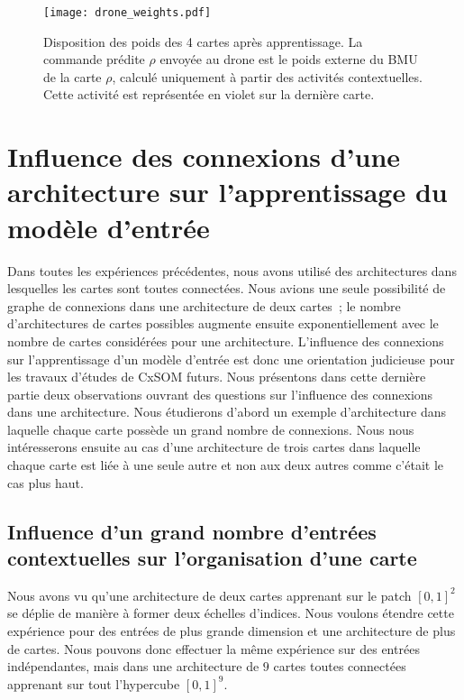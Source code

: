 \documentclass[../main]{subfiles}
\begin{document}
\begin{figure}
\texttt{[image: drone\_weights.pdf]}
\caption{Disposition des poids des 4 cartes après apprentissage. La commande prédite $\rho$ envoyée au drone est le poids externe du BMU de la carte $\rho$, calculé uniquement à partir des activités contextuelles. Cette activité est représentée en violet sur la dernière carte.}
\label{fig:drone_w}
\end{figure}

\section{Influence des connexions d'une architecture sur l'apprentissage du modèle d'entrée}
Dans toutes les expériences précédentes, nous avons utilisé des architectures dans lesquelles les cartes sont toutes connectées.
Nous avions une seule possibilité de graphe de connexions dans une architecture de deux cartes~; le nombre d'architectures de cartes possibles augmente ensuite exponentiellement avec le nombre de cartes considérées pour une architecture.
L'influence des connexions sur l'apprentissage d'un modèle d'entrée est donc une orientation judicieuse pour les travaux d'études de CxSOM futurs.
Nous présentons dans cette dernière partie deux observations ouvrant des questions sur l'influence des connexions dans une architecture.
Nous étudierons d'abord un exemple d'architecture dans laquelle chaque carte possède un grand nombre de connexions.
Nous nous intéresserons ensuite au cas d'une architecture de trois cartes dans laquelle chaque carte est liée à une seule autre et non aux deux autres comme c'était le cas plus haut.

\subsection{Influence d'un grand nombre d'entrées contextuelles sur l'organisation d'une carte}

Nous avons vu qu'une architecture de deux cartes apprenant sur le patch $[0,1]^2$ se déplie de manière à former deux échelles d'indices. 
Nous voulons étendre cette expérience pour des entrées de plus grande dimension et une architecture de plus de cartes. Nous pouvons donc effectuer la même expérience sur des entrées indépendantes, mais dans une architecture de $9$ cartes toutes connectées apprenant sur tout l'hypercube $[0,1]^9$.
\end{document}
